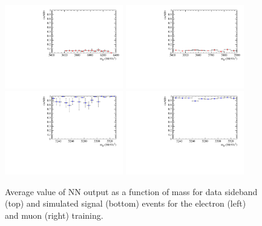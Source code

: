 \begin{figure}[h!]
\centering
\includegraphics[width=0.46\textwidth]{RKst/figs/Training/EE_wNB_vs_MPV_bkg.pdf}
\includegraphics[width=0.46\textwidth]{RKst/figs/Training/MM_wNB_vs_MPV_bkg.pdf}
\includegraphics[width=0.46\textwidth]{RKst/figs/Training/EE_wNB_vs_MPV_sgn.pdf}
\includegraphics[width=0.46\textwidth]{RKst/figs/Training/MM_wNB_vs_MPV_sgn.pdf}
\caption{Average value of NN output as a function of \Bz mass for data
sideband (top) and simulated signal (bottom) events for the electron (left) and muon (right) training.}
\label{fig:RKst_NNprofiles}
\end{figure}
%
%
